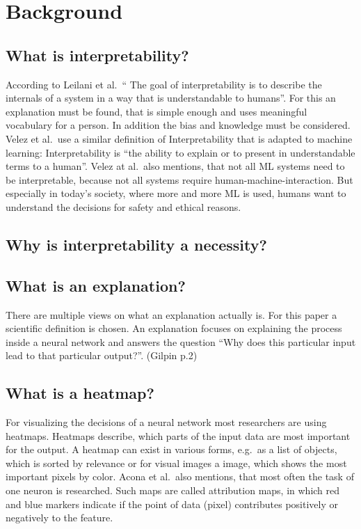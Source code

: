 \section{Background}
\blindtext[3]

\subsection{What is interpretability?}
According to Leilani et al.\ “ The goal of interpretability is to describe the internals of a system in a way that is understandable to humans”. For this an explanation must be found, that is simple enough and uses meaningful vocabulary for a person. In addition the bias and knowledge must be considered.
Velez et al.\ use a similar definition of Interpretability that is adapted to machine learning: Interpretability is “the ability to explain or to present in understandable terms to a human”. Velez at al.\ also mentions, that not all ML systems need to be interpretable, because not all systems require human-machine-interaction. But especially in today's society, where more and more ML is used, humans want to understand the decisions for safety and ethical reasons.


\subsection{Why is interpretability a necessity?}
\blindtext[3]

\subsection{What is an explanation?}
There are multiple views on what an explanation actually is. For this paper a scientific definition is chosen. An explanation focuses on explaining the process inside a neural network and answers the question “Why does this particular input lead to that particular output?”. (Gilpin p.2)

\subsection{What is a heatmap?} For visualizing the decisions of a neural network most researchers are using heatmaps. Heatmaps describe, which parts of the input data are most important for the output. A heatmap can exist in various forms, e.g.\ as a list of objects, which is sorted by relevance or for visual images a image, which shows the most important pixels by color. Acona et al.\ also mentions, that most often the task of one neuron is researched. Such maps are called attribution maps, in which red and blue markers indicate if the point of data (pixel) contributes positively or negatively to the feature.